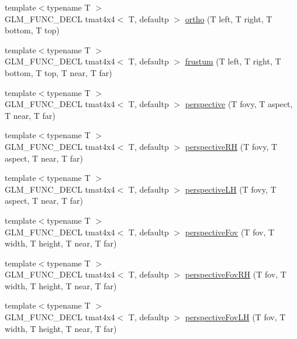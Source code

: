 \begin{DoxyCompactItemize}
{\footnotesize template$<$typename T $>$ }\\G\+L\+M\+\_\+\+F\+U\+N\+C\+\_\+\+D\+E\+C\+L tmat4x4$<$ T, defaultp $>$ \hyperlink{group__gtc__matrix__transform_ga45b1b64f99255c07119b4f1aaed04dd7}{ortho} (T left, T right, T bottom, T top)
\item 
{\footnotesize template$<$typename T $>$ }\\G\+L\+M\+\_\+\+F\+U\+N\+C\+\_\+\+D\+E\+C\+L tmat4x4$<$ T, defaultp $>$ \hyperlink{group__gtc__matrix__transform_gada6deb989d4b553fe0f7e3279f3afae1}{frustum} (T left, T right, T bottom, T top, T near, T far)
\item 
{\footnotesize template$<$typename T $>$ }\\G\+L\+M\+\_\+\+F\+U\+N\+C\+\_\+\+D\+E\+C\+L tmat4x4$<$ T, defaultp $>$ \hyperlink{group__gtc__matrix__transform_gac3613dcb6c6916465ad5b7ad5a786175}{perspective} (T fovy, T aspect, T near, T far)
\item 
{\footnotesize template$<$typename T $>$ }\\G\+L\+M\+\_\+\+F\+U\+N\+C\+\_\+\+D\+E\+C\+L tmat4x4$<$ T, defaultp $>$ \hyperlink{group__gtc__matrix__transform_ga5a4fa9f8ffabb2294e48a18bf8fa2f5f}{perspective\+R\+H} (T fovy, T aspect, T near, T far)
\item 
{\footnotesize template$<$typename T $>$ }\\G\+L\+M\+\_\+\+F\+U\+N\+C\+\_\+\+D\+E\+C\+L tmat4x4$<$ T, defaultp $>$ \hyperlink{group__gtc__matrix__transform_ga34048da27c559f1ac8e9550d169dd6f3}{perspective\+L\+H} (T fovy, T aspect, T near, T far)
\item 
{\footnotesize template$<$typename T $>$ }\\G\+L\+M\+\_\+\+F\+U\+N\+C\+\_\+\+D\+E\+C\+L tmat4x4$<$ T, defaultp $>$ \hyperlink{group__gtc__matrix__transform_gae9146e2c550fc8646299e4b900238145}{perspective\+Fov} (T fov, T width, T height, T near, T far)
\item 
{\footnotesize template$<$typename T $>$ }\\G\+L\+M\+\_\+\+F\+U\+N\+C\+\_\+\+D\+E\+C\+L tmat4x4$<$ T, defaultp $>$ \hyperlink{group__gtc__matrix__transform_ga07cd8df791bf90dcb782645fe0b21261}{perspective\+Fov\+R\+H} (T fov, T width, T height, T near, T far)
\item 
{\footnotesize template$<$typename T $>$ }\\G\+L\+M\+\_\+\+F\+U\+N\+C\+\_\+\+D\+E\+C\+L tmat4x4$<$ T, defaultp $>$ \hyperlink{group__gtc__matrix__transform_gae705a2f19c3ef5ef880bd6c92759cf2d}{perspective\+Fov\+L\+H} (T fov, T width, T height, T near, T far)

\end{DoxyCompactItemize}
